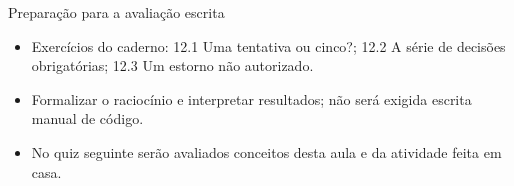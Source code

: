 \documentclass[10pt,aspectratio=169]{beamer}
\begin{document}
\begin{frame}[t]{Preparação para a avaliação escrita}
\small
\begin{itemize}
\item Exercícios do caderno: 12.1 Uma tentativa ou cinco?; 12.2 A série de decisões obrigatórias; 12.3 Um estorno não autorizado.
\item Formalizar o raciocínio e interpretar resultados; não será exigida escrita manual de código.
\item No quiz seguinte serão avaliados conceitos desta aula e da atividade feita em casa.
\end{itemize}
\end{frame}
\end{document}
